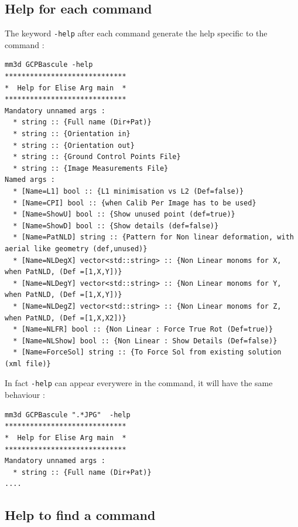 
\subsection{Help for each command}

The keyword {\tt -help} after each command generate the help specific to the command :

\begin{verbatim}
mm3d GCPBascule -help
*****************************
*  Help for Elise Arg main  *
*****************************
Mandatory unnamed args : 
  * string :: {Full name (Dir+Pat)}
  * string :: {Orientation in}
  * string :: {Orientation out}
  * string :: {Ground Control Points File}
  * string :: {Image Measurements File}
Named args : 
  * [Name=L1] bool :: {L1 minimisation vs L2 (Def=false)}
  * [Name=CPI] bool :: {when Calib Per Image has to be used}
  * [Name=ShowU] bool :: {Show unused point (def=true)}
  * [Name=ShowD] bool :: {Show details (def=false)}
  * [Name=PatNLD] string :: {Pattern for Non linear deformation, with aerial like geometry (def,unused)}
  * [Name=NLDegX] vector<std::string> :: {Non Linear monoms for X, when PatNLD, (Def =[1,X,Y])}
  * [Name=NLDegY] vector<std::string> :: {Non Linear monoms for Y, when PatNLD, (Def =[1,X,Y])}
  * [Name=NLDegZ] vector<std::string> :: {Non Linear monoms for Z, when PatNLD, (Def =[1,X,X2])}
  * [Name=NLFR] bool :: {Non Linear : Force True Rot (Def=true)}
  * [Name=NLShow] bool :: {Non Linear : Show Details (Def=false)}
  * [Name=ForceSol] string :: {To Force Sol from existing solution (xml file)}
\end{verbatim}

In fact {\tt -help} can appear everywere in the command, it will have the same
behaviour :

\begin{verbatim}
mm3d GCPBascule ".*JPG"  -help
*****************************
*  Help for Elise Arg main  *
*****************************
Mandatory unnamed args : 
  * string :: {Full name (Dir+Pat)}
....
\end{verbatim}


\subsection{Help to find a command}

